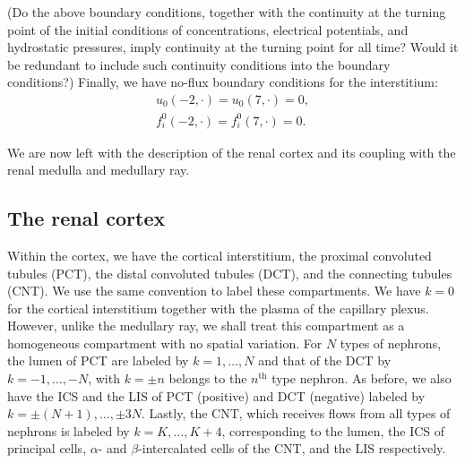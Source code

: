 \documentclass{article}
\begin{document}
{\color{red}(Do the above boundary conditions, together with the continuity at the turning point of the initial conditions of concentrations, electrical potentials, and hydrostatic pressures, imply continuity at the turning point for all time?
Would it be redundant to include such continuity conditions into the boundary conditions?)}
Finally, we have no-flux boundary conditions for the interstitium:
\begin{gather}
    u_0(-2,\cdot) = u_0(7,\cdot)=0,\\
    f_i^0(-2,\cdot) = f_i^0(7,\cdot) = 0.
\end{gather}



We are now left with the description of the renal cortex and its coupling with the renal medulla and medullary ray.

\subsection{The renal cortex}

Within the cortex, we have the cortical interstitium, the proximal convoluted tubules (PCT), the distal convoluted tubules (DCT), and the connecting tubules (CNT).
We use the same convention to label these compartments.
We have $k=0$ for the cortical interstitium together with the plasma of the capillary plexus.
However, unlike the medullary ray, we shall treat this compartment as a homogeneous compartment with no spatial variation.
For $N$ types of nephrons, the lumen of PCT are labeled by $k=1,\dots,N$ and that of the DCT by $k=-1,\dots,-N$, with $k=\pm n$ belongs to the $n^{\mathrm{th}}$ type nephron.
As before, we also have the ICS and the LIS of PCT (positive) and DCT (negative) labeled by $k=\pm(N+1),\dots,\pm 3N$.
Lastly, the CNT, which receives flows from all types of nephrons is labeled by $k=K,\dots,K+4$, corresponding to the lumen, the ICS of principal cells, $\alpha$- and $\beta$-intercalated cells of the CNT, and the LIS respectively.
\end{document}
